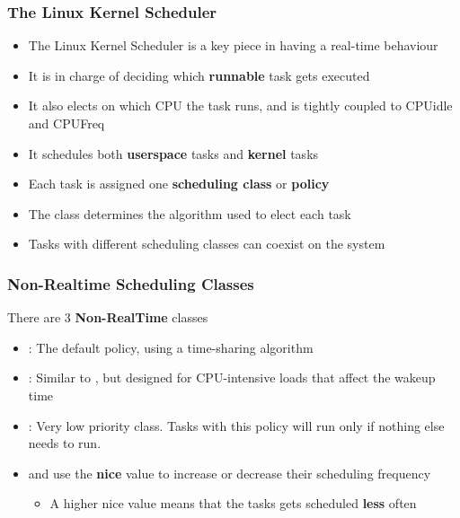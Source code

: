 \begin{frame}
        \frametitle{The Linux Kernel Scheduler}
        \begin{itemize}
                \item The Linux Kernel Scheduler is a key piece in having a real-time behaviour
                \item It is in charge of deciding which \textbf{runnable} task gets executed
                \item It also elects on which CPU the task runs, and is tightly coupled to CPUidle and CPUFreq
                \item It schedules both \textbf{userspace} tasks and \textbf{kernel} tasks
                \item Each task is assigned one \textbf{scheduling class} or \textbf{policy}
                \item The class determines the algorithm used to elect each task
                \item Tasks with different scheduling classes can coexist on the system
        \end{itemize}
\end{frame}

\begin{frame}
        \frametitle{Non-Realtime Scheduling Classes}
        There are 3 \textbf{Non-RealTime} classes
        \begin{itemize}
                \item {}: The default policy, using a time-sharing algorithm
                \item {}: Similar to , but designed for CPU-intensive loads that affect the wakeup time
                \item {}: Very low priority class. Tasks with this policy will run only if nothing else needs to run.
                \item {} and  use the \textbf{nice} value to increase or decrease their scheduling frequency
                \begin{itemize}
                        \item A higher nice value means that the tasks gets scheduled \textbf{less} often
                \end{itemize}
        \end{itemize}
\end{frame}

